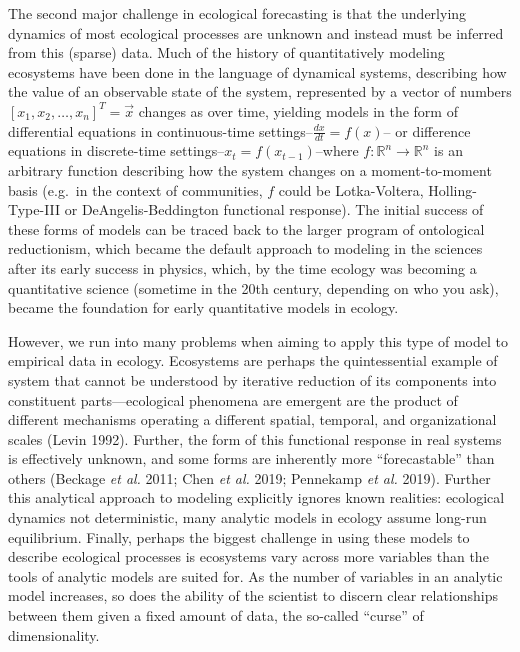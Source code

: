 \documentclass[11pt]{article}
\begin{document}
The second major challenge in ecological forecasting is that the
underlying dynamics of most ecological processes are unknown and instead
must be inferred from this (sparse) data. Much of the history of
quantitatively modeling ecosystems have been done in the language of
dynamical systems, describing how the value of an observable state of
the system, represented by a vector of numbers
\([x_1, x_2, \dots, x_n]^T = \vec{x}\) changes as over time, yielding
models in the form of differential equations in continuous-time
settings--\(\frac{dx}{dt} = f(x)\)-- or difference equations in
discrete-time settings--\(x_t = f(x_{t-1})\)--where
\(f:\mathbb{R}^n \to \mathbb{R}^n\) is an arbitrary function describing
how the system changes on a moment-to-moment basis (e.g.~in the context
of communities, \(f\) could be Lotka-Voltera, Holling-Type-III or
DeAngelis-Beddington functional response). The initial success of these
forms of models can be traced back to the larger program of ontological
reductionism, which became the default approach to modeling in the
sciences after its early success in physics, which, by the time ecology
was becoming a quantitative science (sometime in the 20th century,
depending on who you ask), became the foundation for early quantitative
models in ecology.

However, we run into many problems when aiming to apply this type of
model to empirical data in ecology. Ecosystems are perhaps the
quintessential example of system that cannot be understood by iterative
reduction of its components into constituent parts---ecological
phenomena are emergent are the product of different mechanisms operating
a different spatial, temporal, and organizational scales (Levin 1992).
Further, the form of this functional response in real systems is
effectively unknown, and some forms are inherently more ``forecastable''
than others (Beckage \emph{et al.} 2011; Chen \emph{et al.} 2019;
Pennekamp \emph{et al.} 2019). Further this analytical approach to
modeling explicitly ignores known realities: ecological dynamics not
deterministic, many analytic models in ecology assume long-run
equilibrium. Finally, perhaps the biggest challenge in using these
models to describe ecological processes is ecosystems vary across more
variables than the tools of analytic models are suited for. As the
number of variables in an analytic model increases, so does the ability
of the scientist to discern clear relationships between them given a
fixed amount of data, the so-called ``curse'' of dimensionality.
\end{document}
